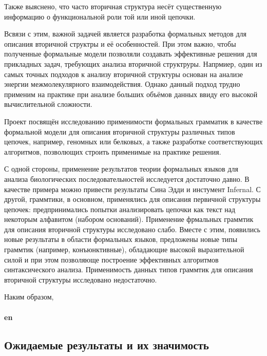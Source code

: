 \documentclass[12pt]{article}  %
\theoremstyle{remark}
\begin{document}
Также выяснено, что часто вторичная структура несёт существенную информацию о функциональной роли той или иной цепочки.

Всвязи с этим, важной задачей является разработка формальных методов для описания вторичной структры и её особенностей.
При этом важно, чтобы полученные формальные модели позволяли создавать эффективные решения для прикладных задач, требующих анализа вторичной структруры.
Напрмиер, один из самых точных подходов к анализу вторичной структуры основан на анализе энергии межмолекулярного взаимодействия.
Однако данный подход трудно применим на практике при анализе больших объёмов данных ввиду его высокой вычислительной сложности.

Проект посвящён исследованию применимости формальных грамматик в качестве формальной модели для описания вторичной структуры различных типов цепочек, например, геномных или белковых, а также разработке соответствующих алгоритмов, позволющих строить применимые на практике решения.

С одной стороны, применение результатов теории формальных языков для анализа биологических последовательностей исследуется достаточно давно.
В качестве примера можно привести результаты Сина Эдди и инстумент Infernal.
С другой, граммтики, в основном, применялись для описания первичной структуры цепочек: предпринимались попытки анализировать цепочки как текст над некоторым алфавитом (набором оснований).
Применение фрмальных граммтик для описания вторичной структуры исследовано слабо.
Вместе с этим, появились новые результаты в области формальных языков, предложены новые типы граммтик (например, конъюнктивные), обладающие высокой выразительной силой и при этом позволяюще построение эффективных алгоритмов синтаксического анализа.
Применимость данных типов граммтик для описания вторичной структуры исследовано недостаточно.



Наким образом,
\\
\\
\textbf{en}\\


\subsection{Ожидаемые результаты и их значимость}
\end{document}

